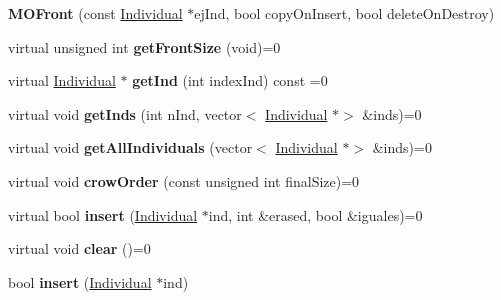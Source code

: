 \begin{DoxyCompactItemize}
\item 
\mbox{\label{classMOFront_acdf484ed4e10a203ade8c6d46e5231db}} 
{\bfseries M\+O\+Front} (const \mbox{\hyperlink{classIndividual}{Individual}} $\ast$ej\+Ind, bool copy\+On\+Insert, bool delete\+On\+Destroy)
\item 
\mbox{\label{classMOFront_a27a75fdcbdebcce00eb7e7cf841be0ee}} 
virtual unsigned int {\bfseries get\+Front\+Size} (void)=0
\item 
\mbox{\label{classMOFront_a762cc5626addc8e2e74c0a0488c9f132}} 
virtual \mbox{\hyperlink{classIndividual}{Individual}} $\ast$ {\bfseries get\+Ind} (int index\+Ind) const =0
\item 
\mbox{\label{classMOFront_a4f20b517e095b9ed4085c221f23c25d5}} 
virtual void {\bfseries get\+Inds} (int n\+Ind, vector$<$ \mbox{\hyperlink{classIndividual}{Individual}} $\ast$$>$ \&inds)=0
\item 
\mbox{\label{classMOFront_a2fdce6082e4f54d341178e9f50784e23}} 
virtual void {\bfseries get\+All\+Individuals} (vector$<$ \mbox{\hyperlink{classIndividual}{Individual}} $\ast$$>$ \&inds)=0
\item 
\mbox{\label{classMOFront_a91bd2b2f0ae1b1d233d3226a9292833c}} 
virtual void {\bfseries crow\+Order} (const unsigned int final\+Size)=0
\item 
\mbox{\label{classMOFront_a1893dce7aa33cf49e0fbcd6811f3188b}} 
virtual bool {\bfseries insert} (\mbox{\hyperlink{classIndividual}{Individual}} $\ast$ind, int \&erased, bool \&iguales)=0
\item 
\mbox{\label{classMOFront_ac0b6579eed5fe9d76ff490d44b49cdc2}} 
virtual void {\bfseries clear} ()=0
\item 
\mbox{\label{classMOFront_ab1a4da76deee102a8ff108f18ad56177}} 
bool {\bfseries insert} (\mbox{\hyperlink{classIndividual}{Individual}} $\ast$ind)
\item 
\mbox{\label{classMOFront_a04772ab2fddf45ce52507bd4c2eacbbd}} 

\end{DoxyCompactItemize}
